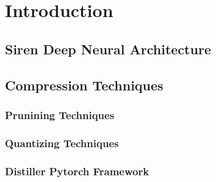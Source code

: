 



\section{Introduction}
\subsection{Siren Deep Neural Architecture}

% 

% 
% 
% 
% 


\subsection{Compression Techniques}



\subsubsection{Prunining Techniques}
\subsubsection{Quantizing Techniques}
\subsubsection{Distiller Pytorch Framework}
